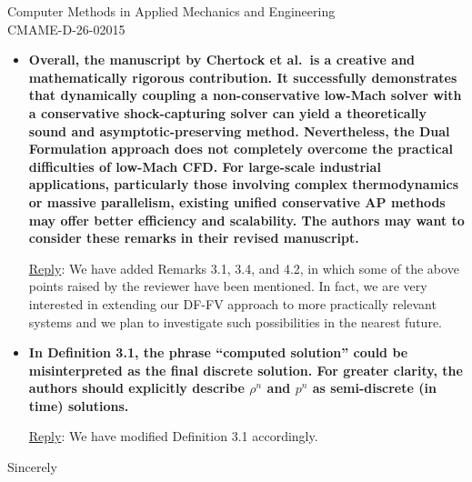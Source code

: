 \documentclass[letter,11pt]{letter}
\theoremstyle{remark}
\begin{document}
\begin{letter}{Computer Methods in Applied Mechanics and Engineering\\
CMAME-D-26-02015}
\begin{itemize}[wide, labelwidth=!, labelindent=0pt]
\smallskip
{\sc\underline{Reply}}: We fully agree that several viable and fully conservative AP schemes for the Euler equations have been successfully
developed in recent years, and we have mentioned some of the relevant works in the Introduction. We have also emphasized there that the
flux splitting strategy proposed in [26] is, in a certain sense, optimal for the isentropic Euler equations, and that extending this
particular splitting strategy to the full Euler equations is not straightforward.

\smallskip
In this context, the main advantage of the proposed AP DF-FV method is that it can be viewed as an extension of the optimal splitting
strategy from [26] to the full Euler system through the nonconservative formulation.

\medskip
\item{\bf Overall, the manuscript by Chertock et al.\ is a creative and mathematically rigorous contribution. It successfully demonstrates
that dynamically coupling a non-conservative low-Mach solver with a conservative shock-capturing solver can yield a theoretically sound and
asymptotic-preserving method. Nevertheless, the Dual Formulation approach does not completely overcome the practical difficulties of
low-Mach CFD. For large-scale industrial applications, particularly those involving complex thermodynamics or massive parallelism, existing
unified conservative AP methods may offer better efficiency and scalability. The authors may want to consider these remarks in their revised
manuscript.}
	
\smallskip
{\sc\underline{Reply}}: We have added Remarks 3.1, 3.4, and 4.2, in which some of the above points raised by the reviewer have been
mentioned. In fact, we are very interested in extending our DF-FV approach to more practically relevant systems and we plan to investigate
such possibilities in the nearest future.

\medskip
\item{\bf In Definition 3.1, the phrase ``computed solution'' could be misinterpreted as the final discrete solution. For greater clarity,
the authors should explicitly describe $\rho^n$ and $p^n$ as semi-discrete (in time) solutions.}
	
\smallskip
{\sc\underline{Reply}}: We have modified Definition 3.1 accordingly.
\end{itemize}
\vspace*{2cm}
\closing{Sincerely} %
\end{letter}
\end{document}
